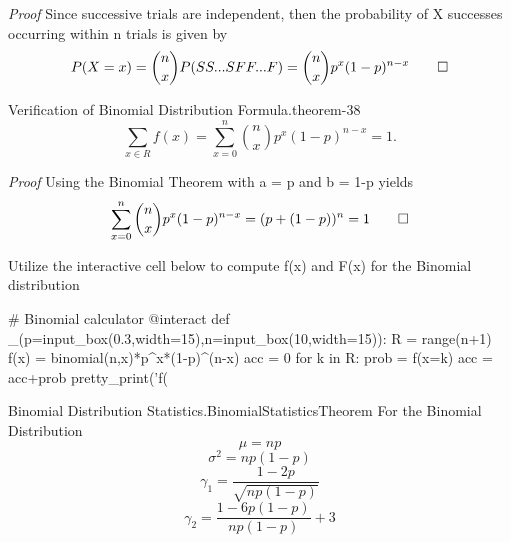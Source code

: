 \documentclass[10pt,]{book}
\makeatletter
\renewcommand*{\proofname}{Proof}
\renewenvironment{proof}[1][\proofname]{\par
  \pushQED{\qed}%
  \normalfont \topsep6\p@\@plus6\p@\relax
  \trivlist
  \item\relax
    {\itshape
    #1\@addpunct{.}}\hspace\labelsep\ignorespaces
}{%
  \popQED\endtrivlist\@endpefalse
}
\numberwithin{equation}{section}
\makeatother
\begin{document}
\begin{proof}\hypertarget{proof-39}{}
\hypertarget{p-857}{}%
Since successive trials are independent, then the probability of X successes occurring within n trials is given by%
\begin{equation*}
P(X=x) = \binom{n}{x}P(SS...SFF...F) = 		
\binom{n}{x}p^x(1-p)^{n-x}\qedhere
\end{equation*}
%
\end{proof}
%
\par
\hypertarget{p-858}{}%
\begin{theorem}{Verification of Binomial Distribution Formula.}{}{theorem-38}%
\hypertarget{p-859}{}%
%
\begin{equation*}
\sum_{x \in R} f(x) = \sum_{x=0}^n \binom{n}{x}p^x(1-p)^{n-x} = 1.
\end{equation*}
%
\end{theorem}
\begin{proof}\hypertarget{proof-40}{}
\hypertarget{p-860}{}%
Using the Binomial Theorem with a = p and b = 1-p yields%
\begin{equation*}
\sum_{x=0}^n \binom{n}{x}p^x(1-p)^{n-x} = (p + (1-p))^n = 1\qedhere
\end{equation*}
%
\end{proof}
%
\par
\hypertarget{p-861}{}%
Utilize the interactive cell below to compute f(x) and F(x) for the Binomial distribution%
\par
\hypertarget{p-862}{}%
\leavevmode%
\begin{sageinput}
# Binomial calculator
@interact
def _(p=input_box(0.3,width=15),n=input_box(10,width=15)):
    R = range(n+1)
    f(x) = binomial(n,x)*p^x*(1-p)^(n-x)
    acc = 0
    for k in R:
        prob = f(x=k)
        acc = acc+prob
        pretty_print('f(%
\end{sageinput}
%
\par
\hypertarget{p-863}{}%
\begin{theorem}{Binomial Distribution Statistics.}{}{BinomialStatisticsTheorem}%
\hypertarget{BinomialStatistics}{}%
For the Binomial Distribution%
\begin{equation*}
\mu = np
\end{equation*}
%
\begin{equation*}
\sigma^2 = np(1-p)
\end{equation*}
%
\begin{equation*}
\gamma_1 = \frac{1-2p}{\sqrt{np(1-p)}}
\end{equation*}
%
\begin{equation*}
\gamma_2 = \frac{1-6p(1-p)}{np(1-p)} + 3
\end{equation*}
%
\end{theorem}
\end{document}
